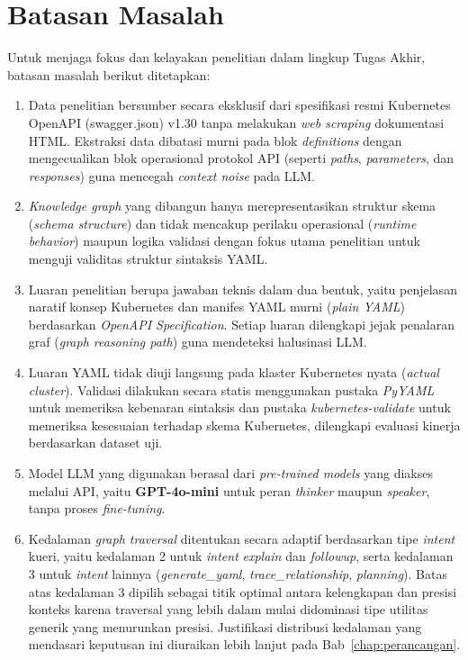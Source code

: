 \section{Batasan Masalah}
Untuk menjaga fokus dan kelayakan penelitian dalam lingkup Tugas Akhir, batasan masalah berikut ditetapkan:
\begin{enumerate}
    \item Data penelitian bersumber secara eksklusif dari spesifikasi resmi Kubernetes OpenAPI (swagger.json) v1.30 tanpa melakukan \textit{web scraping} dokumentasi HTML. Ekstraksi data dibatasi murni pada blok \textit{definitions} dengan mengecualikan blok operasional protokol API (seperti \textit{paths}, \textit{parameters}, dan \textit{responses}) guna mencegah \textit{context noise} pada LLM.

    \item \textit{Knowledge graph} yang dibangun hanya merepresentasikan struktur skema (\textit{schema structure}) dan tidak mencakup perilaku operasional (\textit{runtime behavior}) maupun logika validasi dengan fokus utama penelitian untuk menguji validitas struktur sintaksis YAML.

    \item Luaran penelitian berupa jawaban teknis dalam dua bentuk, yaitu penjelasan naratif konsep Kubernetes dan manifes YAML murni (\textit{plain YAML}) berdasarkan \textit{OpenAPI Specification}. Setiap luaran dilengkapi jejak penalaran graf (\textit{graph reasoning path}) guna mendeteksi halusinasi LLM.

    \item Luaran YAML tidak diuji langsung pada klaster Kubernetes nyata (\textit{actual cluster}). Validasi dilakukan secara statis menggunakan pustaka \textit{PyYAML} untuk memeriksa kebenaran sintaksis dan pustaka \textit{kubernetes-validate} untuk memeriksa kesesuaian terhadap skema Kubernetes, dilengkapi evaluasi kinerja berdasarkan dataset uji.

    \item Model LLM yang digunakan berasal dari \textit{pre-trained models} yang diakses melalui API, yaitu \textbf{GPT-4o-mini} untuk peran \textit{thinker} maupun \textit{speaker}, tanpa proses \textit{fine-tuning}.

    \item Kedalaman \textit{graph traversal} ditentukan secara adaptif berdasarkan tipe \textit{intent} kueri, yaitu kedalaman 2 untuk \textit{intent} \textit{explain} dan \textit{followup}, serta kedalaman 3 untuk \textit{intent} lainnya (\textit{generate\_yaml}, \textit{trace\_relationship}, \textit{planning}). Batas atas kedalaman 3 dipilih sebagai titik optimal antara kelengkapan dan presisi konteks karena traversal yang lebih dalam mulai didominasi tipe utilitas generik yang menurunkan presisi. Justifikasi distribusi kedalaman yang mendasari keputusan ini diuraikan lebih lanjut pada Bab~\ref{chap:perancangan}.


\end{enumerate}
